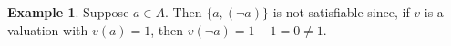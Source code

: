 \documentclass[12pt]{article}
\theoremstyle{definition}
\newtheorem*{example}{\color{teal} Example}
\begin{document}
\begin{multicols*}{2}
\begin{example}
	Suppose $a\in A$. Then $\{a, (\neg a)\}$ is not satisfiable since, if $v$ is a valuation with $v(a) = 1$, then $v(\neg a) = 1-1 = 0 \neq 1$.
\end{example}
\iffalse\begin{example}
	Suppose $a,b,c\in A$ are distinct. Let $v$ be a valuation with $v(a)=v(b)=1$ and $v(c)=0$. Then
	\begin{align*}
		v(a\rightarrow b) &= \max\{1 - v(a), v(b)\} \\
		&= \max\{0, 1\} \\
		&= 1
	\end{align*}
	and
	\begin{align*}
		v(b\rightarrow(\neg c)) \\
		&= \max\{1 - v(b), v(\neg c)\} \\
		&= \max\{0,1\} \\
		&= 1\,.
	\end{align*}
	So, $v$ shows that
	\[
	\{a, (a\rightarrow b), (b\rightarrow(\neg c))\}
	\]
	is satisfiable, although there are other valuations not sending all three of these to $1$.
\end{example}\fi


\end{multicols*}
\end{document}
